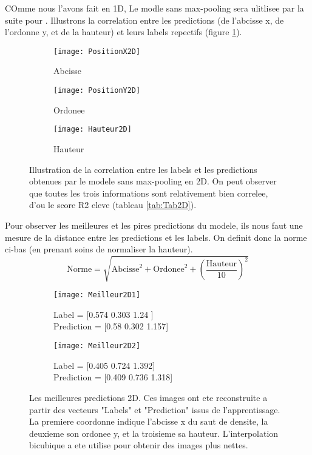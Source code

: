     COmme nous l'avons fait en 1D, Le modle sans max-pooling sera ulitlisee par la suite pour . Illustrons la correlation entre les predictions (de l'abcisse x, de l'ordonne y, et de la hauteur) et leurs labels repectifs (figure \ref{fig:Illustration2D}).
    \begin{figure}[!h]
    \begin{subfigure}{.33\textwidth}
    \centering
    \texttt{[image: PositionX2D]}  
    \caption[PosX2D]{Abcisse}
    \end{subfigure}
    \begin{subfigure}{.33\textwidth}
    \centering
    \texttt{[image: PositionY2D]}  
    \caption[PosY2D]{Ordonee}
    \end{subfigure}
    \begin{subfigure}{.33\textwidth}
    \centering
    \texttt{[image: Hauteur2D]}  
    \caption[H2D]{Hauteur}
    \end{subfigure}
    
     \centering
    \decoRule
    \caption[Illustration 2D]{Illustration de la correlation entre les labels et les predictions obtenues par le modele sans max-pooling en 2D. On peut observer que toutes les trois informations sont relativement bien correlee, d'ou le score R2 eleve (tableau \ref{tab:Tab2D}).}
    \label{fig:Illustration2D}
    \end{figure}
    
    Pour observer les meilleures et les pires predictions du modele, ils nous faut une mesure de la distance entre les predictions et les labels. On definit donc la norme ci-bas (en prenant soins de normaliser la hauteur). $$ \text{Norme} = \sqrt{\text{Abcisse}^2 + \text{Ordonee}^2 + \left( \frac{\text{Hauteur}}{10} \right)^2}$$
    
    \begin{figure}[!h]
    \begin{subfigure}{.5\textwidth}
    \centering
    \texttt{[image: Meilleur2D1]}  
    \caption[Meilleur2D1]{Label = [0.574 0.303 1.24 ] \\ Prediction = [0.58  0.302 1.157]}
    \end{subfigure}
    \begin{subfigure}{.5\textwidth}
    \centering
    \texttt{[image: Meilleur2D2]}  
    \caption[Meilleur2D2]{Label = [0.405 0.724 1.392]  \\  Prediction = [0.409 0.736 1.318]}
    \end{subfigure}
    
     \centering
    \decoRule
    \caption[Meilleur 2D]{Les meilleures predictions 2D. Ces images ont ete reconstruite a partir des  vecteurs "Labels" et "Prediction" issus de l'apprentissage. La premiere coordonne indique l'abcisse x du saut de densite, la deuxieme son ordonee y, et la troisieme sa hauteur. L'interpolation bicubique a ete utilise pour obtenir des images plus nettes.}
    \label{fig:Meilleur2D}
    \end{figure}

